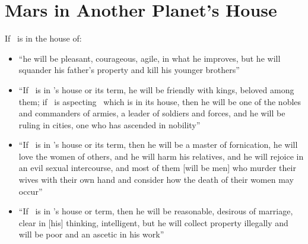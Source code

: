 \section{Mars in Another Planet's House}
If \Mars\, is in the house of:
\begin{itemize}[topsep=0em,itemsep=0em]
\item[\Saturn] ``he will be pleasant, courageous, agile, in what he improves, but he will squander his father's property and kill his younger brothers''

\item[\Jupiter] ``If \Mars\, is in \Jupiter's house or its term, he will be friendly with kings, beloved among them; if \Jupiter\, is aspecting \Mars\, which is in its house, then he will be one of the nobles and commanders of armies, a leader of soldiers and forces, and he will be ruling in cities, one who has ascended in nobility''

\item[\Venus] ``If \Mars\, is in \Venus's house or its term, then he will be a master of fornication, he will love the women of others, and he will harm his relatives, and he will rejoice in an evil sexual intercourse, and most of them [will be men] who murder their wives with their own hand and consider how the death of their women may occur''

\item[\Mercury] ``If \Mars\, is in \Mercury's house or term, then he will be reasonable, desirous of marriage, clear in [his] thinking, intelligent, but he will collect property illegally and will be poor and an ascetic in his work''
\end{itemize}